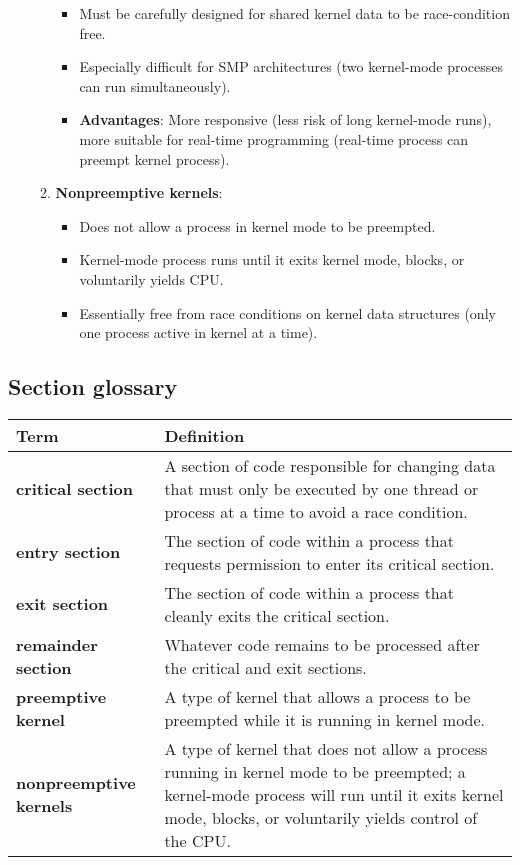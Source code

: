 \begin{itemize}
\begin{enumerate}
\begin{itemize}
            \item Must be carefully designed for shared kernel data to be race-condition free.
            \item Especially difficult for SMP architectures (two kernel-mode processes can run simultaneously).
            \item \textbf{Advantages}: More responsive (less risk of long kernel-mode runs), more suitable for real-time programming (real-time process can preempt kernel process).
        \end{itemize}
        \item \textbf{Nonpreemptive kernels}:
        \begin{itemize}
            \item Does not allow a process in kernel mode to be preempted.
            \item Kernel-mode process runs until it exits kernel mode, blocks, or voluntarily yields CPU.
            \item Essentially free from race conditions on kernel data structures (only one process active in kernel at a time).
        \end{itemize}
    \end{enumerate}
\end{itemize}

\subsection{Section glossary}
\centering
\begin{tabular}{>{\raggedright}p{} >{\raggedright\arraybackslash}p{}}
\toprule
\textbf{Term} & \textbf{Definition} \\
\midrule
\textbf{critical section} & A section of code responsible for changing data that must only be executed by one thread or process at a time to avoid a race condition. \\
\textbf{entry section} & The section of code within a process that requests permission to enter its critical section. \\
\textbf{exit section} & The section of code within a process that cleanly exits the critical section. \\
\textbf{remainder section} & Whatever code remains to be processed after the critical and exit sections. \\
\textbf{preemptive kernel} & A type of kernel that allows a process to be preempted while it is running in kernel mode. \\
\textbf{nonpreemptive kernels} & A type of kernel that does not allow a process running in kernel mode to be preempted; a kernel-mode process will run until it exits kernel mode, blocks, or voluntarily yields control of the CPU. \\
\bottomrule
\end{tabular}
\vspace{\baselineskip}
